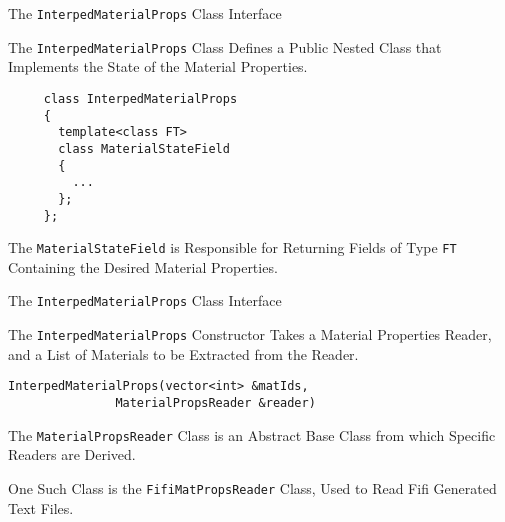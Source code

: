 \documentclass{myslidehead}
\begin{document}
\begin{slide}

  \begin{center}
    \large The \verb#InterpedMaterialProps# Class Interface
  \end{center}

  The \verb#InterpedMaterialProps# Class Defines a Public Nested Class
  that Implements the State of the Material Properties.

  \begin{verbatim}
     class InterpedMaterialProps
     {
       template<class FT>
       class MaterialStateField
       {
         ...
       };
     };
  \end{verbatim}

  The \verb#MaterialStateField# is Responsible for Returning Fields of
  Type \verb#FT# Containing the Desired Material Properties.

\end{slide}


\begin{slide}
  
  \begin{center}
    \large The \verb#InterpedMaterialProps# Class Interface
  \end{center}

  The \verb#InterpedMaterialProps#
  Constructor Takes a Material Properties Reader,
  and a List of Materials to be Extracted from the Reader.

  \begin{verbatim}
InterpedMaterialProps(vector<int> &matIds,
               MaterialPropsReader &reader)
  \end{verbatim}

  The \verb#MaterialPropsReader# Class is an Abstract Base Class from which
  Specific Readers are Derived.

  One Such Class is the \verb#FifiMatPropsReader# Class, Used to Read
  Fifi Generated Text Files.

\end{slide}

\end{document}
